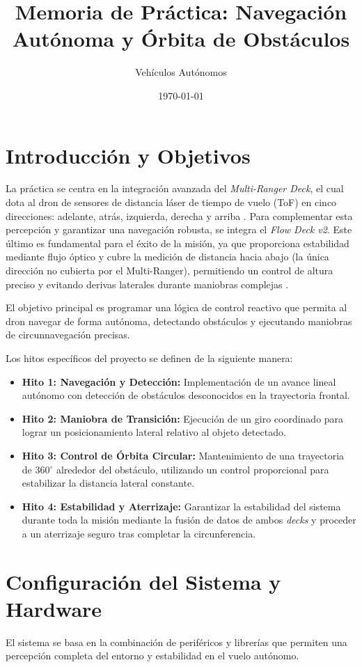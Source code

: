 \documentclass[12pt,a4paper]{article}
\title{\textbf{Memoria de Práctica: Navegación Autónoma y Órbita de Obstáculos}}
\author{Vehículos Autónomos}
\date{\today}
\begin{document}
\maketitle

\section{Introducción y Objetivos}
La práctica se centra en la integración avanzada del \textit{Multi-Ranger Deck}, el cual dota al dron de sensores de distancia láser de tiempo de vuelo (ToF) en cinco direcciones: adelante, atrás, izquierda, derecha y arriba \cite{6}. Para complementar esta percepción y garantizar una navegación robusta, se integra el \textit{Flow Deck v2}. Este último es fundamental para el éxito de la misión, ya que proporciona estabilidad mediante flujo óptico y cubre la medición de distancia hacia abajo (la única dirección no cubierta por el Multi-Ranger), permitiendo un control de altura preciso y evitando derivas laterales durante maniobras complejas \cite{10, 53}.

El objetivo principal es programar una lógica de control reactivo que permita al dron navegar de forma autónoma, detectando obstáculos y ejecutando maniobras de circunnavegación precisas.

Los hitos específicos del proyecto se definen de la siguiente manera:
\begin{itemize}
    \item \textbf{Hito 1: Navegación y Detección:} Implementación de un avance lineal autónomo con detección de obstáculos desconocidos en la trayectoria frontal.
    \item \textbf{Hito 2: Maniobra de Transición:} Ejecución de un giro coordinado para lograr un posicionamiento lateral relativo al objeto detectado.
    \item \textbf{Hito 3: Control de Órbita Circular:} Mantenimiento de una trayectoria de 360$^\circ$ alrededor del obstáculo, utilizando un control proporcional para estabilizar la distancia lateral constante.
    \item \textbf{Hito 4: Estabilidad y Aterrizaje:} Garantizar la estabilidad del sistema durante toda la misión mediante la fusión de datos de ambos \textit{decks} y proceder a un aterrizaje seguro tras completar la circunferencia.
\end{itemize} 

\section{Configuración del Sistema y Hardware}
El sistema se basa en la combinación de periféricos y librerías que permiten una percepción completa del entorno y estabilidad en el vuelo autónomo.
\end{document}
